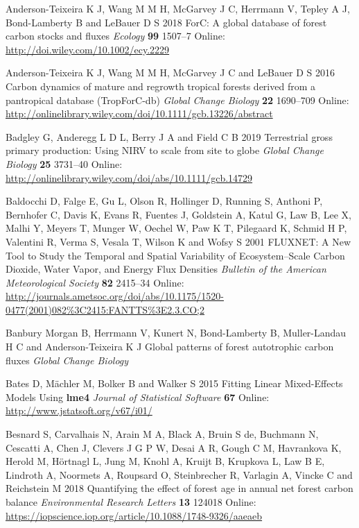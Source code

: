 \documentclass[
]{article}
\newlength{\cslhangindent}
\newenvironment{cslreferences}%
  {\setlength{\parindent}{0pt}%
  \everypar{\setlength{\hangindent}{\cslhangindent}}\ignorespaces}%
  {\par}
\begin{document}
\begin{cslreferences}
\leavevmode\hypertarget{ref-anderson-teixeira_forc_2018}{}%
Anderson-Teixeira K J, Wang M M H, McGarvey J C, Herrmann V, Tepley A J,
Bond-Lamberty B and LeBauer D S 2018 ForC: A global database of forest
carbon stocks and fluxes \emph{Ecology} \textbf{99} 1507--7 Online:
\url{http://doi.wiley.com/10.1002/ecy.2229}

\leavevmode\hypertarget{ref-anderson-teixeira_carbon_2016}{}%
Anderson-Teixeira K J, Wang M M H, McGarvey J C and LeBauer D S 2016
Carbon dynamics of mature and regrowth tropical forests derived from a
pantropical database (TropForC-db) \emph{Global Change Biology}
\textbf{22} 1690--709 Online:
\url{http://onlinelibrary.wiley.com/doi/10.1111/gcb.13226/abstract}

\leavevmode\hypertarget{ref-badgley_terrestrial_2019}{}%
Badgley G, Anderegg L D L, Berry J A and Field C B 2019 Terrestrial
gross primary production: Using NIRV to scale from site to globe
\emph{Global Change Biology} \textbf{25} 3731--40 Online:
\url{http://onlinelibrary.wiley.com/doi/abs/10.1111/gcb.14729}

\leavevmode\hypertarget{ref-baldocchi_fluxnet_2001}{}%
Baldocchi D, Falge E, Gu L, Olson R, Hollinger D, Running S, Anthoni P,
Bernhofer C, Davis K, Evans R, Fuentes J, Goldstein A, Katul G, Law B,
Lee X, Malhi Y, Meyers T, Munger W, Oechel W, Paw K T, Pilegaard K,
Schmid H P, Valentini R, Verma S, Vesala T, Wilson K and Wofsy S 2001
FLUXNET: A New Tool to Study the Temporal and Spatial Variability of
Ecosystem--Scale Carbon Dioxide, Water Vapor, and Energy Flux Densities
\emph{Bulletin of the American Meteorological Society} \textbf{82}
2415--34 Online:
\url{http://journals.ametsoc.org/doi/abs/10.1175/1520-0477(2001)082\%3C2415:FANTTS\%3E2.3.CO;2}

\leavevmode\hypertarget{ref-banbury_morgan_global_nodate}{}%
Banbury Morgan B, Herrmann V, Kunert N, Bond-Lamberty B, Muller-Landau H
C and Anderson-Teixeira K J Global patterns of forest autotrophic carbon
fluxes \emph{Global Change Biology}

\leavevmode\hypertarget{ref-bates_fitting_2015}{}%
Bates D, Mächler M, Bolker B and Walker S 2015 Fitting Linear
Mixed-Effects Models Using \textbf{lme4} \emph{Journal of Statistical
Software} \textbf{67} Online: \url{http://www.jstatsoft.org/v67/i01/}

\leavevmode\hypertarget{ref-besnard_quantifying_2018}{}%
Besnard S, Carvalhais N, Arain M A, Black A, Bruin S de, Buchmann N,
Cescatti A, Chen J, Clevers J G P W, Desai A R, Gough C M, Havrankova K,
Herold M, Hörtnagl L, Jung M, Knohl A, Kruijt B, Krupkova L, Law B E,
Lindroth A, Noormets A, Roupsard O, Steinbrecher R, Varlagin A, Vincke C
and Reichstein M 2018 Quantifying the effect of forest age in annual net
forest carbon balance \emph{Environmental Research Letters} \textbf{13}
124018 Online:
\url{https://iopscience.iop.org/article/10.1088/1748-9326/aaeaeb}


\end{cslreferences}
\end{document}
